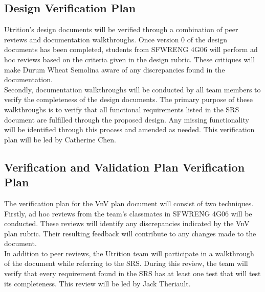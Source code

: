 \documentclass[12pt, titlepage]{article}
\begin{document}
	\subsection{Design Verification Plan}
	
	
	
	
	Utrition's design documents will be verified through a combination of peer reviews and documentation walkthroughs. Once version 0 of the design documents has been completed, students from SFWRENG 4G06 will perform ad hoc reviews based on the criteria given in the design rubric. These critiques will make Durum Wheat Semolina aware of any discrepancies found in the documentation.\\
	
	Secondly, documentation walkthroughs will be conducted by all team members to verify the completeness of the design documents. The primary purpose of these walkthroughs is to verify that all functional requirements listed in the SRS document are fulfilled through the proposed design. Any missing functionality will be identified through this process and amended as needed. This verification plan will be led by Catherine Chen.
	
	\subsection{Verification and Validation Plan Verification Plan}
	
	
	
	
	The verification plan for the VnV plan document will consist of two techniques. Firstly, ad hoc reviews from the team's classmates in SFWRENG 4G06 will be conducted. These reviews will identify any discrepancies indicated by the VnV plan rubric. Their resulting feedback will contribute to any changes made to the document.\\
	
	In addition to peer reviews, the Utrition team will participate in a walkthrough of the document while referring to the SRS. During this review, the team will verify that every requirement found in the SRS has at least one test that will test its completeness. This review will be led by Jack Theriault. 
	
\end{document}
